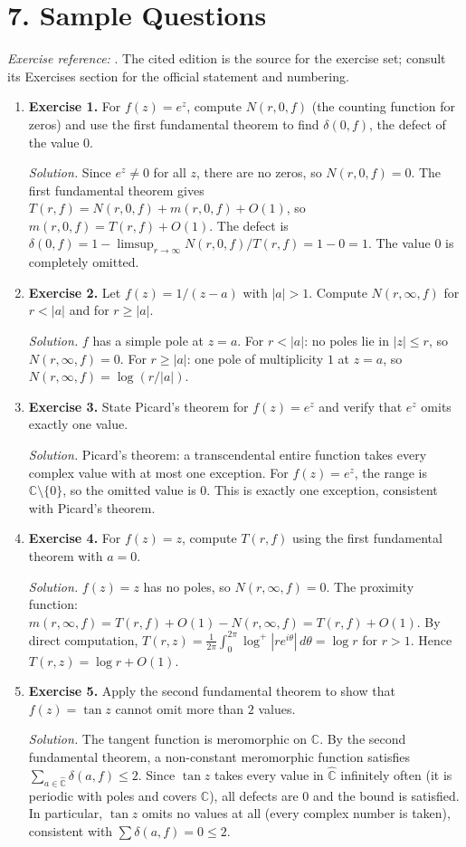 \section*{7. Sample Questions}
\emph{Exercise reference:} \cite{nevanlinna_theory_ref1}. The cited edition is the source for the exercise set; consult its Exercises section for the official statement and numbering.
\begin{enumerate}[leftmargin=*,itemsep=0.9em]
\item \textbf{Exercise 1.} For $f(z)=e^z$, compute $N(r,0,f)$ (the counting function for zeros) and use the first fundamental theorem to find $\delta(0,f)$, the defect of the value $0$.

\emph{Solution.} Since $e^z\neq 0$ for all $z$, there are no zeros, so $N(r,0,f)=0$. The first fundamental theorem gives $T(r,f)=N(r,0,f)+m(r,0,f)+O(1)$, so $m(r,0,f)=T(r,f)+O(1)$. The defect is $\delta(0,f)=1-\limsup_{r\to\infty}N(r,0,f)/T(r,f)=1-0=1$. The value $0$ is completely omitted.

\item \textbf{Exercise 2.} Let $f(z)=1/(z-a)$ with $|a|>1$. Compute $N(r,\infty,f)$ for $r<|a|$ and for $r\geq |a|$.

\emph{Solution.} $f$ has a simple pole at $z=a$. For $r<|a|$: no poles lie in $|z|\leq r$, so $N(r,\infty,f)=0$. For $r\geq |a|$: one pole of multiplicity $1$ at $z=a$, so $N(r,\infty,f)=\log(r/|a|)$.

\item \textbf{Exercise 3.} State Picard's theorem for $f(z)=e^z$ and verify that $e^z$ omits exactly one value.

\emph{Solution.} Picard's theorem: a transcendental entire function takes every complex value with at most one exception. For $f(z)=e^z$, the range is $\mathbb{C}\setminus\{0\}$, so the omitted value is $0$. This is exactly one exception, consistent with Picard's theorem.

\item \textbf{Exercise 4.} For $f(z)=z$, compute $T(r,f)$ using the first fundamental theorem with $a=0$.

\emph{Solution.} $f(z)=z$ has no poles, so $N(r,\infty,f)=0$. The proximity function: $m(r,\infty,f)=T(r,f)+O(1)-N(r,\infty,f)=T(r,f)+O(1)$. By direct computation, $T(r,z)=\frac{1}{2\pi}\int_0^{2\pi}\log^+|re^{i\theta}|\,d\theta=\log r$ for $r>1$. Hence $T(r,z)=\log r+O(1)$.

\item \textbf{Exercise 5.} Apply the second fundamental theorem to show that $f(z)=\tan z$ cannot omit more than $2$ values.

\emph{Solution.} The tangent function is meromorphic on $\mathbb{C}$. By the second fundamental theorem, a non-constant meromorphic function satisfies $\sum_{a\in\hat{\mathbb{C}}}\delta(a,f)\leq 2$. Since $\tan z$ takes every value in $\hat{\mathbb{C}}$ infinitely often (it is periodic with poles and covers $\mathbb{C}$), all defects are $0$ and the bound is satisfied. In particular, $\tan z$ omits no values at all (every complex number is taken), consistent with $\sum\delta(a,f)=0\leq 2$.

\end{enumerate}
